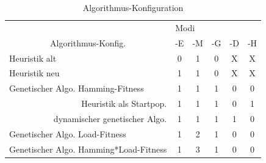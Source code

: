 	\begin{table}[htp]
		\centering
		\begin{tabular}{ccccccc}
			\multicolumn{2}{l}{}                 & \multicolumn{5}{|l}{Modi}                                                               \\ 
			\multicolumn{2}{c}{Algorithmus-Konfig.}  & \multicolumn{1}{|c}{-E} & \multicolumn{1}{c}{-M} & \multicolumn{1}{c}{-G} & \multicolumn{1}{c}{-D} & \multicolumn{1}{c}{-H}  \\ 
			\hline
		\multicolumn{2}{l}{Heuristik alt}  & \multicolumn{1}{|c}{0} & \multicolumn{1}{c}{1} & \multicolumn{1}{c}{0} & \multicolumn{1}{c}{X} & \multicolumn{1}{c}{X} \\
		\multicolumn{2}{l}{Heuristik neu}  & \multicolumn{1}{|c}{1} & \multicolumn{1}{c}{1} & \multicolumn{1}{c}{0} & \multicolumn{1}{c}{X} & \multicolumn{1}{c}{X}  \\ 
		\multicolumn{2}{l}{Genetischer Algo. Hamming-Fitness}  & \multicolumn{1}{|c}{1} & \multicolumn{1}{c}{1} & \multicolumn{1}{c}{1} & \multicolumn{1}{c}{0} & \multicolumn{1}{c}{0} \\
			\multicolumn{2}{r}{Heuristik als Startpop.}  & \multicolumn{1}{|c}{1} & \multicolumn{1}{c}{1} & \multicolumn{1}{c}{1} & \multicolumn{1}{c}{0} & \multicolumn{1}{c}{1}  \\
			\multicolumn{2}{r}{dynamischer genetischer Algo.}  & \multicolumn{1}{|c}{1} & \multicolumn{1}{c}{1} & \multicolumn{1}{c}{1} & \multicolumn{1}{c}{1} & \multicolumn{1}{c}{0} \\
		\multicolumn{2}{l}{Genetischer Algo. Load-Fitness}  & \multicolumn{1}{|c}{1} & \multicolumn{1}{c}{2} & \multicolumn{1}{c}{1} & \multicolumn{1}{c}{0} & \multicolumn{1}{c}{0}   \\ 
		\multicolumn{2}{l}{Genetischer Algo. Hamming*Load-Fitness}  & \multicolumn{1}{|c}{1} & \multicolumn{1}{c}{3} & \multicolumn{1}{c}{1} & \multicolumn{1}{c}{0} & \multicolumn{1}{c}{0}                
		\end{tabular}
		\newline
		\caption{Algorithmus-Konfiguration}
		\label{tab:algo_conifg}
	\end{table}

